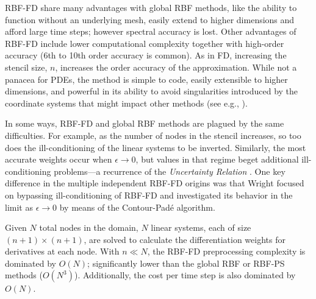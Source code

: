\documentclass[11pt]{report}
\begin{document}
{RBF-FD 
share many advantages with global RBF methods, 
like the ability to function without an underlying mesh, easily extend to higher dimensions and afford large time steps; however spectral accuracy is lost. 
Other advantages of RBF-FD 
include lower computational complexity together with high-order accuracy
(6th to 10th order accuracy is common). 
As in FD, increasing the stencil size, $n$, increases the order accuracy of the approximation. While not a panacea for PDEs, the method is simple to code, easily extensible to higher dimensions, and powerful in its ability to avoid singularities introduced by the coordinate systems that might impact other methods (see e.g., \cite{FlyerWright07,FornbergLehto11}). 

In some ways, RBF-FD and global RBF methods are plagued by the same difficulties. For example, as the number of nodes in the stencil increases, so too does the ill-conditioning of the linear systems to be inverted. Similarly, the most accurate weights occur when $\epsilon \rightarrow 0$, but values in that regime beget additional ill-conditioning problems---a recurrence of the \emph{Uncertainty Relation} \cite{Schaback1995}. One key difference in the multiple independent RBF-FD origins was that Wright \cite{Wright2003} focused on bypassing ill-conditioning of RBF-FD and investigated its behavior in the limit as $\epsilon \rightarrow 0$ by means of the Contour-Pad\'{e} algorithm. 

Given $N$ total nodes in the domain, $N$ linear systems, each of size $(n+1) \times (n+1)$, are solved to calculate the differentiation weights for derivatives at each node. With $n \ll N$, the RBF-FD preprocessing complexity is dominated by $O(N)$; significantly lower than the global RBF or RBF-PS methods ($O(N^3)$). Additionally, the cost per time step is also dominated by $O(N)$. 

}
\end{document}
